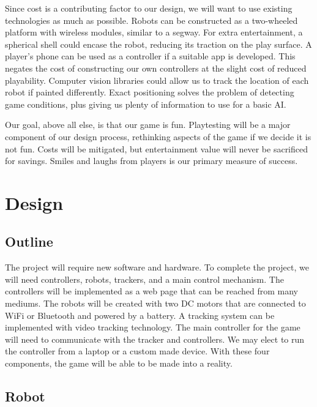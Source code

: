 \documentclass[11pt]{ieeeconf}
\begin{document}
Since cost is a contributing factor to our design, we will want to use existing technologies as much as possible. Robots can be constructed as a two-wheeled platform with wireless modules, similar to a segway. For extra entertainment, a spherical shell could encase the robot, reducing its traction on the play surface. A player’s phone can be used as a controller if a suitable app is developed. This negates the cost of constructing our own controllers at the slight cost of reduced playability. Computer vision libraries could allow us to track the location of each robot if painted differently. Exact positioning solves the problem of detecting game conditions, plus giving us plenty of information to use for a basic AI. 

Our goal, above all else, is that our game is fun. Playtesting will be a major component of our design process, rethinking aspects of the game if we decide it is not fun. Costs will be mitigated, but entertainment value will never be sacrificed for savings. Smiles and laughs from players is our primary measure of success.

\section{Design}

\subsection{Outline}

The project will require new software and hardware. To complete the project, we will need controllers, robots, trackers, and a main control mechanism. The controllers will be implemented as a web page that can be reached from many mediums. The robots will be created with two DC motors that are connected to WiFi or Bluetooth and powered by a battery.  A tracking system can be implemented with video tracking technology. The main controller for the game will need to communicate with the tracker and controllers. We may elect to run the controller from a laptop or a custom made device. With these four components, the game will be able to be made into a reality.

\subsection{Robot}
\end{document}
